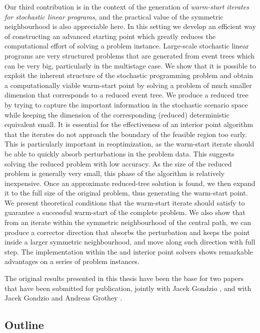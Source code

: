 Our third contribution is in the context of the generation of 
{\em warm-start iterates for stochastic linear programs}, 
and the practical value of the 
symmetric neighbourhood is also appreciable here.
In this setting we develop an efficient way of constructing 
an advanced starting point which greatly reduces the computational
effort of solving a problem instance.
Large-scale stochastic linear programs are very structured problems
that are generated from event trees which can be very big, particularly
in the multistage case.
We show that it is possible to exploit the inherent structure of 
the stochastic programming problem and obtain a computationally viable
warm-start point by solving a problem of much smaller
dimension that corresponds to a reduced event tree.
We produce a reduced tree by trying to capture the 
important information in the stochastic scenario space while keeping 
the dimension of the corresponding (reduced) deterministic equivalent small.
It is essential for the effectiveness of an interior point algorithm
that the iterates do not approach the boundary of the
feasible region too early.
This is particularly important in reoptimization, 
as the warm-start iterate should be able to quickly absorb
perturbations in the problem data.
This suggests solving the reduced problem with low accuracy.
As the size of the reduced problem is generally very small,
this phase of the algorithm is relatively inexpensive.
Once an approximate reduced-tree solution is found,
we then expand it to the full size of
the original problem, thus generating the warm-start point.
We present theoretical conditions that the warm-start iterate
should satisfy to guarantee a successful warm-start of the complete 
problem. 
We also show that from an iterate within the symmetric neighbourhood
of the central path, we can produce
a corrector direction that absorbs the perturbation and 
keeps the point inside a larger symmetric neighbourhood,
and move along such direction with full step.
The implementation within the \HOPDM and \OOPS interior point solvers 
shows remarkable advantages on a series of problem instances.

The original results presented in this thesis have been the base for two
papers that have been submitted for publication, jointly with
Jacek Gondzio \cite{ColomboGondzio05}, and with Jacek Gondzio and 
Andreas Grothey \cite{ColomboGondzioGrothey06}.

%
%
\subsection{Outline}

